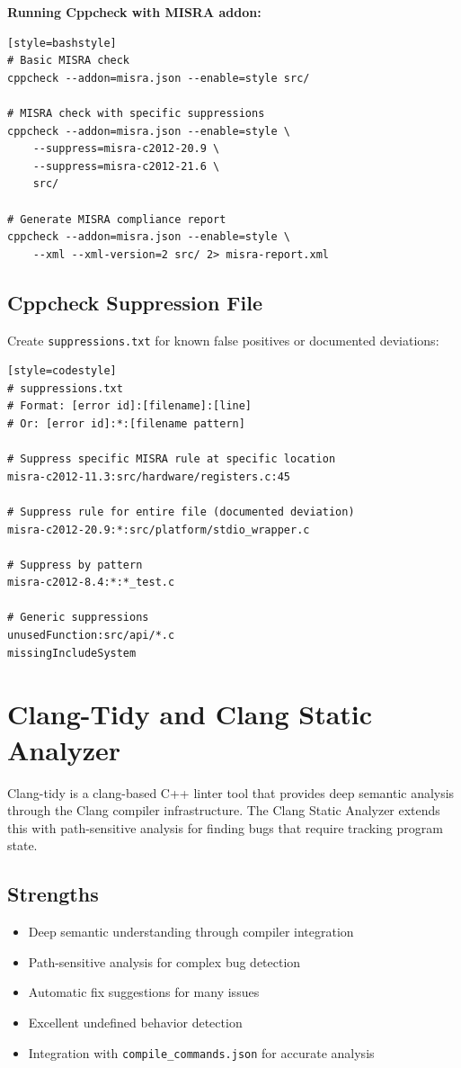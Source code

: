 \documentclass[11pt,letterpaper]{report}
\begin{document}
\textbf{Running Cppcheck with MISRA addon:}

\begin{verbatim}[style=bashstyle]
# Basic MISRA check
cppcheck --addon=misra.json --enable=style src/

# MISRA check with specific suppressions
cppcheck --addon=misra.json --enable=style \
    --suppress=misra-c2012-20.9 \
    --suppress=misra-c2012-21.6 \
    src/

# Generate MISRA compliance report
cppcheck --addon=misra.json --enable=style \
    --xml --xml-version=2 src/ 2> misra-report.xml
\end{verbatim}

\subsection{Cppcheck Suppression File}

Create \texttt{suppressions.txt} for known false positives or documented deviations:

\begin{verbatim}[style=codestyle]
# suppressions.txt
# Format: [error id]:[filename]:[line]
# Or: [error id]:*:[filename pattern]

# Suppress specific MISRA rule at specific location
misra-c2012-11.3:src/hardware/registers.c:45

# Suppress rule for entire file (documented deviation)
misra-c2012-20.9:*:src/platform/stdio_wrapper.c

# Suppress by pattern
misra-c2012-8.4:*:*_test.c

# Generic suppressions
unusedFunction:src/api/*.c
missingIncludeSystem
\end{verbatim}

\section{Clang-Tidy and Clang Static Analyzer}

Clang-tidy is a clang-based C++ linter tool that provides deep semantic analysis through the Clang compiler infrastructure. The Clang Static Analyzer extends this with path-sensitive analysis for finding bugs that require tracking program state.

\subsection{Strengths}

\begin{itemize}[leftmargin=*]
    \item Deep semantic understanding through compiler integration
    \item Path-sensitive analysis for complex bug detection
    \item Automatic fix suggestions for many issues
    \item Excellent undefined behavior detection
    \item Integration with \texttt{compile\_commands.json} for accurate analysis
\end{itemize}
\end{document}
